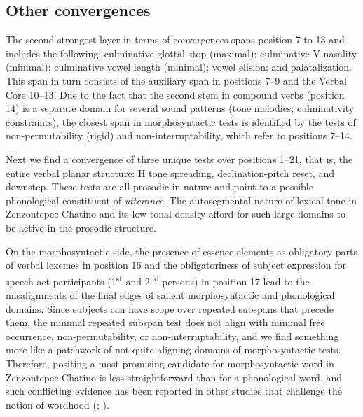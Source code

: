 \documentclass[output=paper]{langscibook}
\begin{document}
\subsection{Other convergences}

The second strongest layer in terms of convergences spans position 7 to 13 and includes the following: culminative glottal stop (maximal); culminative V nasality (minimal); culminative vowel length (minimal); vowel elision; and palatalization. This span in turn consists of the auxiliary span in positions 7{}--9 and the Verbal Core 10--13. Due to the fact that the second stem in compound verbs (position 14) is a separate domain for several sound patterns (tone melodies; culminativity constraints), the closest span in morphosyntactic tests is identified by the tests of non-permutability (rigid) and non-interruptability, which refer to positions 7{}--14.

Next we find a convergence of three unique tests over positions 1{}--21, that is, the entire verbal planar structure: H tone spreading, declination-pitch reset, and downstep. These tests are all prosodic in nature and point to a possible phonological constituent of \textit{utterance}. The autosegmental nature of lexical tone in Zenzontepec Chatino and its low tonal density afford for such large domains to be active in the prosodic structure. 

On the morphosyntactic side, the presence of essence elements as obligatory parts of verbal lexemes in position 16 and the obligatoriness of subject expression for speech act participants (1\textsuperscript{st} and 2\textsuperscript{nd} persons) in position 17 lead to the misalignments of the final edges of salient morphosyntactic and phonological domains. Since subjects can have scope over repeated subspans that precede them, the minimal repeated subspan test does not align with minimal free occurrence, non-permutability, or non-interruptability, and we find something more like a patchwork of not-quite-aligning domains of morphosyntactic tests. Therefore, positing a most promising candidate for morphosyntactic word in Zenzontepec Chatino is less straightforward than for a phonological word, and such conflicting evidence has been reported in other studies that challenge the notion of wordhood (\citealt{Evans2008}; \citealt{Bickel2017}).
\end{document}
